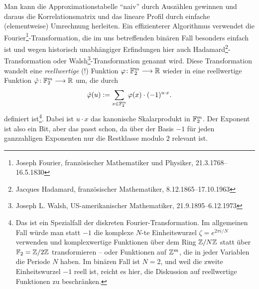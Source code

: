 \begin{refsegment}
Man kann die Approximationstabelle "`naiv"' durch Auszählen gewinnen
und daraus die Korrelationsmatrix und das lineare Profil durch
einfache (elementweise) Umrechnung herleiten. Ein effizienterer
Algorithmus verwendet die Fourier\footnote{%
   Joseph Fourier, französischer Mathematiker und Physiker,
   21.3.1768--16.5.1830
}-Transformation, die im uns betreffenden
binären Fall besonders einfach ist und wegen historisch unabhängiger
Erfindungen hier auch Hadamard\footnote{%
   Jacques Hadamard, französischer Mathematiker, 8.12.1865--17.10.1963
}-Transformation oder Walsh\footnote{%
   Joseph L. Walsh, US-amerikanischer Mathematiker, 21.9.1895--6.12.1973
}-Transformation
genannt wird. Diese Transformation wandelt eine {\em reellwertige} (!)
Funktion $\varphi\!: \mathbb{F}_2^m \longrightarrow \mathbb{R}$ wieder in eine
reellwertige Funktion $\hat{\varphi}\!: \mathbb{F}_2^m \longrightarrow \mathbb{R}$
um, die durch
\[
  \hat{\varphi}(u) := \sum_{x \in \mathbb{F}_2^m} \varphi(x)\cdot (-1)^{u\cdot x}.
\]
definiert ist\footnote{%
   Das ist ein Spezialfall der diskreten
   Fourier-Transformation. Im
   allgemeinen Fall würde man statt $-1$ die komplexe $N$-te
   Einheitswurzel
   $\zeta = e^{2\pi i/N}$ verwenden und komplexwertige Funktionen über
   dem Ring $\mathbb{Z}/N\mathbb{Z}$ statt über $\mathbb{F}_2 = \mathbb{Z}/2\mathbb{Z}$ transformieren -- oder
   Funktionen auf $\mathbb{Z}^m$, die in jeder Variablen die Periode $N$ haben.
   Im binären Fall ist $N = 2$, und weil die zweite Einheitswurzel $-1$
   reell ist, reicht es hier, die Diskussion auf reellwertige Funktionen
   zu beschränken.
}. Dabei ist $u\cdot x$ das kanonische Skalarprodukt
in $\mathbb{F}_2^m$. Der Exponent ist also ein Bit, aber das passt schon,
da über der Basis $-1$ für jeden ganzzahligen Exponenten nur die
Restklasse modulo $2$ relevant ist.


\end{refsegment}
